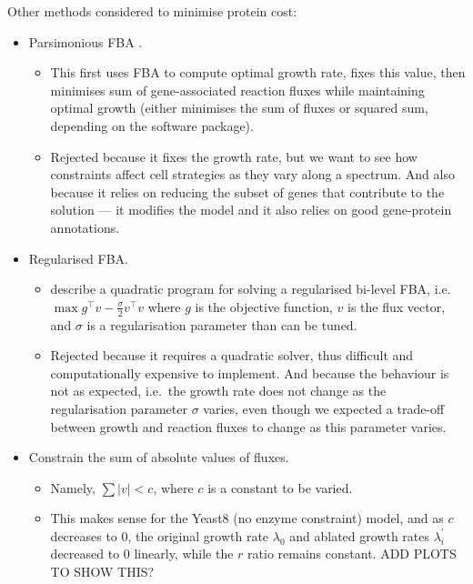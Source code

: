 Other methods considered to minimise protein cost:
\begin{itemize}
  \item Parsimonious FBA \parencite{lewisOmicDataEvolved2010}.
    \begin{itemize}
      \item This first uses FBA to compute optimal growth rate, fixes this value, then minimises sum of gene-associated reaction fluxes while maintaining optimal growth (either minimises the sum of fluxes or squared sum, depending on the software package).
      \item Rejected because it fixes the growth rate, but we want to see how constraints affect cell strategies as they vary along a spectrum.
        And also because it relies on reducing the subset of genes that contribute to the solution --- it modifies the model and it also relies on good gene-protein annotations.
    \end{itemize}
  \item Regularised FBA.
    \begin{itemize}
      \item \textcite{vijayakumarHybridFluxBalance2020} describe a quadratic program for solving a regularised bi-level FBA, i.e.\: $\max g^\intercal v - \frac{\sigma}{2}v^\intercal v$ where $g$ is the objective function, $v$ is the flux vector, and $\sigma$ is a regularisation parameter than can be tuned.
      \item Rejected because it requires a quadratic solver, thus difficult and computationally expensive to implement.
            And because the behaviour is not as expected, i.e.\ the growth rate does not change as the regularisation parameter $\sigma$ varies, even though we expected a trade-off between growth and reaction fluxes to change as this parameter varies.
    \end{itemize}
  \item Constrain the sum of absolute values of fluxes.
    \begin{itemize}
      \item Namely, $\sum |v| < c$, where $c$ is a constant to be varied.
      \item This makes sense for the Yeast8 (no enzyme constraint) model, and as $c$ decreases to 0, the original growth rate $\lambda_{0}$ and ablated growth rates $\lambda_{i}^{\prime}$ decreased to 0 linearly, while the $r$ ratio remains constant.
            ADD PLOTS TO SHOW THIS?
    \end{itemize}
\end{itemize}

